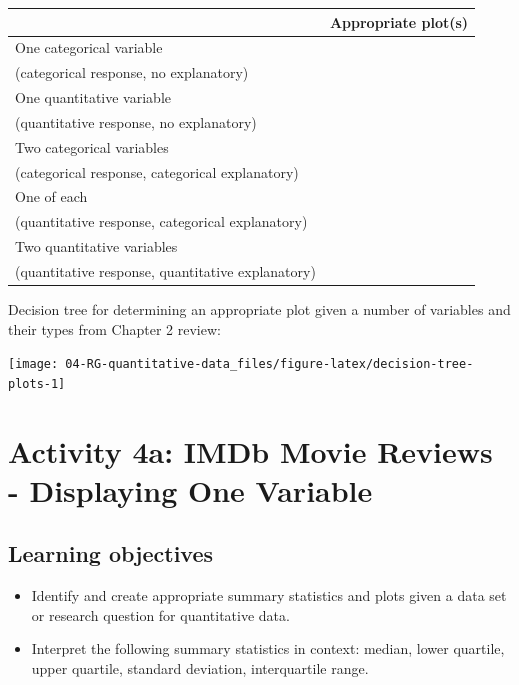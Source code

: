 \documentclass[
]{report}
\newcommand{\rgs}{\vspace{12pt}} %
\begin{document}
\begin{center}
\begin{tabular}{|l|p{3in}|} \hline
 & Appropriate plot(s) \\ \hline
One categorical variable & \\
(categorical response, no explanatory) & \\ \hline
One quantitative variable  & \\
(quantitative response, no explanatory) & \\ \hline
Two categorical variables  & \\
(categorical response, categorical explanatory) & \\ \hline
One of each  & \\
(quantitative response, categorical explanatory) & \\ \hline
Two quantitative variables  & \\
(quantitative response, quantitative explanatory) & \\ \hline
\end{tabular}
\end{center}

\rgs

Decision tree for determining an appropriate plot given a number of variables and their types from Chapter 2 review:

\begin{center}\texttt{[image: 04-RG-quantitative-data\_files/figure-latex/decision-tree-plots-1]} \end{center}

\newpage

\hypertarget{activity-4a-imdb-movie-reviews---displaying-one-variable}{%
\section{Activity 4a: IMDb Movie Reviews - Displaying One Variable}\label{activity-4a-imdb-movie-reviews---displaying-one-variable}}


\hypertarget{learning-objectives}{%
\subsection{Learning objectives}\label{learning-objectives}}

\begin{itemize}
\item
  Identify and create appropriate summary statistics and plots
  given a data set or research question for quantitative data.
\item
  Interpret the following summary statistics in context:
  median, lower quartile, upper quartile,
  standard deviation, interquartile range.
\end{itemize}
\end{document}
